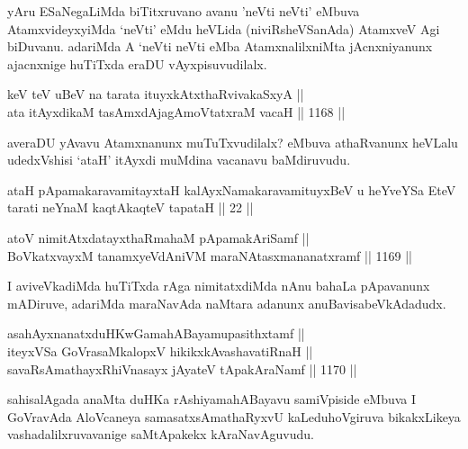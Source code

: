 \begin{artha}
yAru ESaNegaLiMda biTitxruvano avanu 'neVti neVti' eMbuva AtamxvideyxyiMda `neVti' eMdu heVLida (niviRsheVSanAda) AtamxveV Agi biDuvanu. adariMda A `neVti neVti eMba AtamxnalilxniMta jAcnxniyanunx ajacnxnige huTiTxda eraDU vAyxpisuvudilalx.
\end{artha}

\begin{shl}
keV teV uBeV na tarata ituyxkAtxthaRvivakaSxyA ||  \\
ata itAyxdikaM tasAmxdAjagAmoVtatxraM vacaH \hfill || 1168 ||  
\end{shl}

\begin{artha}
averaDU yAvavu Atamxnanunx muTuTxvudilalx? eMbuva athaRvanunx heVLalu udedxVshisi `ataH' itAyxdi muMdina vacanavu baMdiruvudu.
\end{artha}


\begin{shl}
ataH pApamakaravamitayxtaH kalAyxNamakaravamituyxBeV u heYveYSa EteV tarati neYnaM kaqtAkaqteV tapataH || 22 ||
\end{shl}


\begin{shl}
atoV nimitAtxdatayxthaRmahaM pApamakAriSamf || \\
BoVkatxvayxM tanamxyeVdAniVM maraNAtasxmananatxramf \hfill || 1169 ||  
\end{shl}

\begin{artha}
I aviveVkadiMda huTiTxda rAga nimitatxdiMda nAnu bahaLa pApavanunx mADiruve, adariMda maraNavAda naMtara adanunx  anuBavisabeVkAdadudx.
\end{artha}

\begin{shl}
asahAyxnanatxduHKwGamahABayamupasithxtamf || \\
iteyxVSa GoVrasaMkalopxV hikikxkAvashavatiRnaH || \\
savaRsAmathayxRhiVnasayx jAyateV tApakAraNamf \hfill || 1170 ||  
\end{shl}

\begin{artha}
sahisalAgada anaMta duHKa rAshiyamahABayavu samiVpiside eMbuva I GoVravAda  AloVcaneya samasatxsAmathaRyxvU kaLeduhoVgiruva bikakxLikeya vashadalilxruvavanige saMtApakekx kAraNavAguvudu.
\end{artha}

